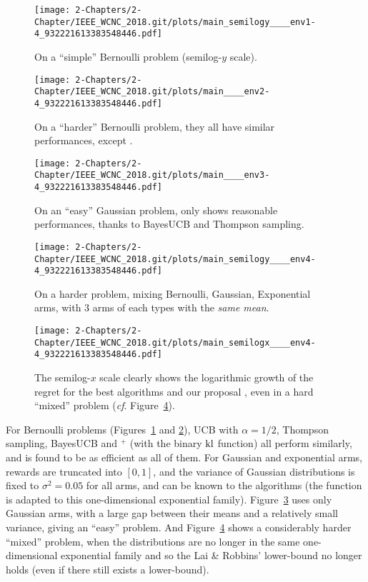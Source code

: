 \begin{figure}[h!]  %
	\centering
	\texttt{[image: 2-Chapters/2-Chapter/IEEE\_WCNC\_2018.git/plots/main\_semilogy\_\_\_\_env1-4\_932221613383548446.pdf]}
	\caption{On a ``simple'' Bernoulli problem (semilog-$y$ scale).}
	\label{fig:25:EasyBernoulli}
\end{figure}

\begin{figure}[b!]  %
	\centering
	\texttt{[image: 2-Chapters/2-Chapter/IEEE\_WCNC\_2018.git/plots/main\_\_\_\_env2-4\_932221613383548446.pdf]}
	\caption{On a ``harder'' Bernoulli problem, they all have similar performances, except \LearnExp.}
	\label{fig:25:HardBernoulli}
\end{figure}

\begin{figure}[b!]  %
	\centering
	\texttt{[image: 2-Chapters/2-Chapter/IEEE\_WCNC\_2018.git/plots/main\_\_\_\_env3-4\_932221613383548446.pdf]}
	\caption{On an ``easy'' Gaussian problem, only \Aggr{} shows reasonable performances, thanks to BayesUCB and Thompson sampling.}
	\label{fig:25:EasyGaussian}
\end{figure}

\begin{figure}[h!]  %
	\centering
	\texttt{[image: 2-Chapters/2-Chapter/IEEE\_WCNC\_2018.git/plots/main\_semilogy\_\_\_\_env4-4\_932221613383548446.pdf]}
	\caption{On a harder problem, mixing Bernoulli, Gaussian, Exponential arms, with 3 arms of each types with the \emph{same mean}.}
	\label{fig:25:HarderMixed}
\end{figure}

\begin{figure}[b!]  %
	\centering
	\texttt{[image: 2-Chapters/2-Chapter/IEEE\_WCNC\_2018.git/plots/main\_semilogx\_\_\_\_env4-4\_932221613383548446.pdf]}
	\caption{The semilog-$x$ scale clearly shows the logarithmic growth of the regret for the best algorithms and our proposal \Aggr, even in a hard ``mixed'' problem (\emph{cf}. Figure~\ref{fig:25:HarderMixed}).}
	\label{fig:25:HarderMixed_semilogx}
\end{figure}

For Bernoulli problems (Figures~\ref{fig:25:EasyBernoulli} and \ref{fig:25:HardBernoulli}), UCB with $\alpha=1/2$, Thompson sampling, BayesUCB and \klUCB{}$^+$ (with the binary $\mathrm{kl}$ function) all perform similarly, and \Aggr{} is found to be as efficient as all of them.
For Gaussian and exponential arms, rewards are truncated into $[0,1]$, and the variance of Gaussian distributions is fixed to $\sigma^2 = 0.05$ for all arms, and can be known to the algorithms (the \kl{} function is adapted to this one-dimensional exponential family).
%
Figure~\ref{fig:25:EasyGaussian} uses only Gaussian arms, with a large gap between their means and a relatively small variance, giving an ``easy'' problem.
%
And Figure~\ref{fig:25:HarderMixed} shows a considerably harder ``mixed'' problem, when the distributions are no longer in the same one-dimensional exponential family and so the Lai \& Robbins' lower-bound no longer holds (even if there still exists a lower-bound).

